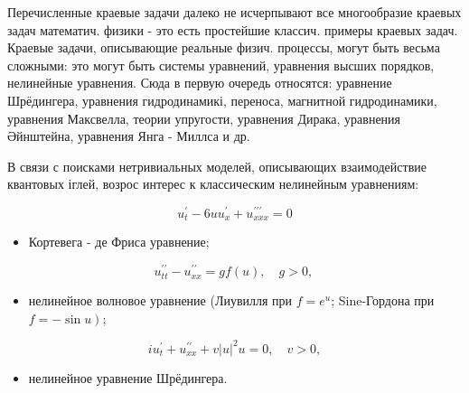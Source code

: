 \documentclass[10pt]{article}
\begin{document}
Перечисленные краевые задачи далеко не исчерпывают все многообразие краевых задач математич. физики - это есть простейшие классич. примеры краевых задач. Краевые задачи, описывающие реальные физич. процессы, могут быть весьма сложными: это могут быть системы уравнений, уравнения высших порядков, нелинейные уравнения. Сюда в первую очередь относятся: уравнение Шрёдингера, уравнения гидродинамикі, переноса, магнитной гидродинамики, уравнения Максвелла, теории упругости, уравнения Дирака, уравнения Әйнштейна, уравнения Янга - Миллса и др.



В связи с поисками нетривиальных моделей, описывающих взаимодействие квантовых іглей, возрос интерес к классическим нелинейным уравнениям:



\[

u_{t}^{\prime}-6 u u_{x}^{\prime}+u_{x x x}^{\prime \prime \prime}=0

\]



\begin{itemize}

  \item Кортевега - де Фриса уравнение;

\end{itemize}



\[

u_{t t}^{\prime \prime}-u_{x x}^{\prime \prime}=g f(u), \quad g>0 \text {, }

\]



\begin{itemize}

  \item нелинейное волновое уравнение (Лиувилля при $f=e^{u}$; Sine-Гордона при $\left.f=-\sin u\right)$;

\end{itemize}



\[

i u_{t}^{\prime}+u_{x x}^{\prime \prime}+v|u|^{2} u=0, \quad v>0,

\]



\begin{itemize}

  \item нелинейное уравнение Шрёдингера.

\end{itemize}
\end{document}
